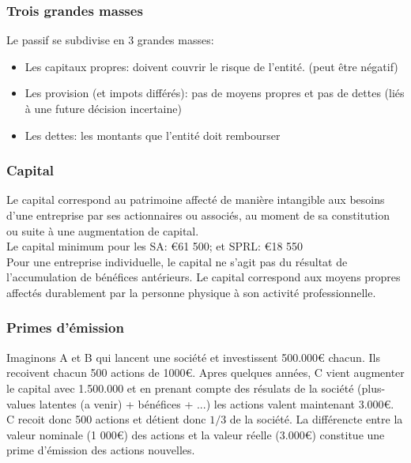 \documentclass{article}
\begin{document}
\subsubsection*{Trois grandes masses}
Le passif se subdivise en 3 grandes masses:
\begin{itemize}
    \item Les capitaux propres: doivent couvrir le risque de l'entité. (peut être négatif)
    \item Les provision (et impots différés): pas de moyens propres et pas de dettes (liés à une future décision incertaine)
    \item Les dettes: les montants que l'entité doit rembourser
\end{itemize}

\subsubsection*{Capital}
Le capital correspond au patrimoine affecté de manière intangible aux besoins d'une entreprise par ses actionnaires ou associés, au moment de sa constitution ou suite à une augmentation de capital. \\
Le capital minimum pour les SA: €61 500; et SPRL: €18 550 \\
Pour une entreprise individuelle, le capital ne s'agit pas du résultat de l'accumulation de bénéfices antérieurs. Le capital correspond aux moyens propres affectés durablement par la personne physique à son activité professionnelle. \\
\subsubsection*{Primes d'émission}
Imaginons A et B qui lancent une société et investissent 500.000€ chacun. Ils recoivent chacun 500 actions de 1000€. Apres quelques années, C vient augmenter le capital avec 1.500.000 et en prenant compte des résulats de la société (plus-values latentes (a venir) + bénéfices + ...) les actions valent maintenant 3.000€. C recoit donc 500 actions et détient donc $1/3$ de la société. La différencte entre la valeur nominale (1 000€) des actions et la valeur réelle (3.000€) constitue une prime d'émission des actions nouvelles. 
\end{document}
